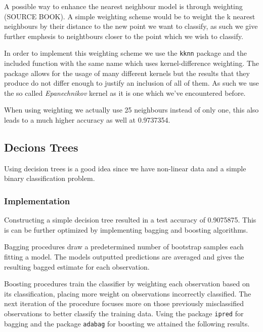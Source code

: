 \documentclass[
]{article}
\begin{document}
A possible way to enhance the nearest neighbour model is through
weighting (SOURCE BOOK). A simple weighting scheme would be to weight
the k nearest neighbours by their distance to the new point we want to
classify, as such we give further emphesis to neightbours closer to the
point which we wish to classify.

In order to implement this weighting scheme we use the \texttt{kknn}
package and the included function with the same name which uses
kernel-difference weighting. The package allows for the usage of many
different kernels but the results that they produce do not differ enough
to justify an inclusion of all of them. As such we use the so called
\emph{Epanechnikov} kernel as it is one which we've encountered before.

When using weighting we actually use 25 neighbours instead of only one,
this also leads to a much higher accuracy as well at 0.9737354.

\hypertarget{decions-trees}{%
\subsection{Decions Trees}\label{decions-trees}}

Using decision trees is a good idea since we have non-linear data and a
simple binary classification problem.

\hypertarget{implementation-2}{%
\subsubsection{Implementation}\label{implementation-2}}

Constructing a simple decision tree resulted in a test accuracy of
0.9075875. This is can be further optimized by implementing bagging and
boosting algorithms.

Bagging procedures draw a predetermined number of bootstrap samples each
fitting a model. The models outputted predictions are averaged and gives
the resulting bagged estimate for each observation.

Boosting procedures train the classifier by weighting each observation
based on its classification, placing more weight on observations
incorrectly classified. The next iteration of the procedure focuses more
on those previously misclassified observations to better classify the
training data. Using the package \texttt{ipred} for bagging and the
package \texttt{adabag} for boosting we attained the following results.
\end{document}
